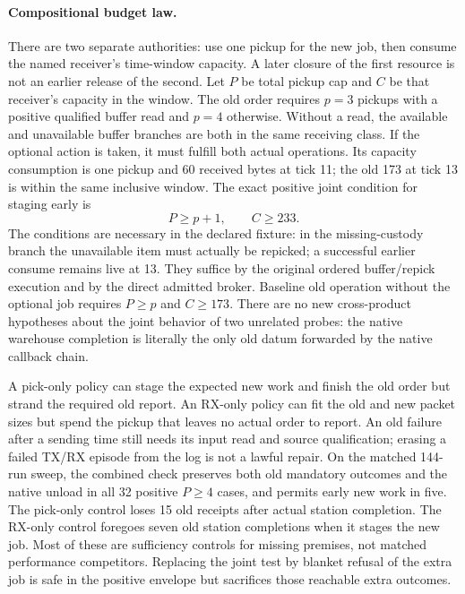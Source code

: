 \documentclass[11pt]{article}
\begin{document}
\paragraph{Compositional budget law.}
There are two separate authorities: use one pickup for the new
job, then consume the named receiver's time-window capacity.
A later closure of the first resource is not an earlier
release of the second. Let \(P\) be total pickup cap and \(C\)
be that receiver's capacity in the window. The old order
requires \(p=3\) pickups with a positive qualified buffer
read and \(p=4\) otherwise. Without a read, the available
and unavailable buffer branches are both in the same
receiving class. If the optional action is taken, it must
fulfill both actual operations. Its capacity consumption is
one pickup and 60 received bytes at tick 11; the old 173
at tick 13 is within the same inclusive window. The exact
positive joint condition for staging early is
\[
                  P\ge p+1,\qquad C\ge233 .
\]
The conditions are necessary in the declared fixture: in
the missing-custody branch the unavailable item must actually
be repicked; a successful earlier consume remains live at
13. They suffice by the original ordered buffer/repick
execution and by the direct admitted broker. Baseline old
operation without the optional job requires \(P\ge p\)
and \(C\ge173\). There are no new cross-product hypotheses
about the joint behavior of two unrelated probes: the native
warehouse completion is literally the only old datum
forwarded by the native callback chain.

A pick-only policy can stage the expected new work and
finish the old order but strand the required old report.
An RX-only policy can fit the old and new packet sizes
but spend the pickup that leaves no actual order to report.
An old failure after a sending time still needs its input
read and source qualification; erasing a failed TX/RX
episode from the log is not a lawful repair. On the matched
144-run sweep, the combined check preserves both old
mandatory outcomes and the native unload in all 32 positive
\(P\ge4\) cases, and permits early new work in five.
The pick-only control loses 15 old receipts after actual
station completion. The RX-only control foregoes seven old
station completions when it stages the new job. Most of
these are sufficiency controls for missing premises, not
matched performance competitors. Replacing the joint test
by blanket refusal of the extra job is safe in the positive
envelope but sacrifices those reachable extra outcomes.
\end{document}
